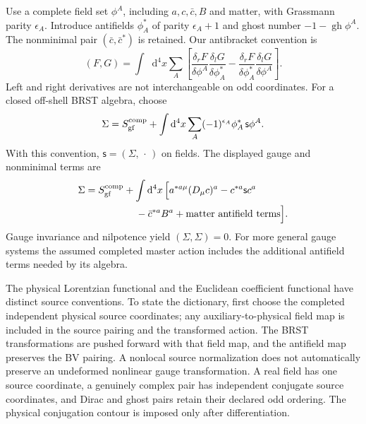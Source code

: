 \documentclass[final,5p,times,twocolumn,numbers,nopreprintline]{elsarticle}
\numberwithin{equation}{section}
\theoremstyle{definition}
\theoremstyle{remark}
\newcommand{\dd}{\mathop{}\!\mathrm d}
\newcommand{\BR}{\mathsf s}
\begin{document}
Use a complete field set \(\phi^A\), including \(a,c,\bar c,B\)
and matter, with Grassmann parity \(\epsilon_A\).
Introduce antifields \(\phi_A^*\) of parity \(\epsilon_A+1\)
and ghost number \(-1-\operatorname{gh}\phi^A\).
The nonminimal pair \((\bar c,\bar c^*)\) is retained.
Our antibracket convention is
\begin{equation}
 (F,G)=\int\dd^4x\sum_A
 \left[
 \frac{\delta_rF}{\delta\phi^A}
 \frac{\delta_lG}{\delta\phi_A^*}
 -
 \frac{\delta_rF}{\delta\phi_A^*}
 \frac{\delta_lG}{\delta\phi^A}
 \right].
 \label{eq:antibracket}
\end{equation}
Left and right derivatives are not interchangeable on odd
coordinates. For a closed off-shell BRST algebra, choose
\begin{equation}
 \Sigma=S_{\rm gf}^{\rm comp}
       +\int\dd^4x\sum_A(-1)^{\epsilon_A}
                   \phi_A^*\,\BR\phi^A.
 \label{eq:bv-action}
\end{equation}
With this convention, \(\BR=(\Sigma,\,\cdot\,)\) on fields.
The displayed gauge and nonminimal terms are
\[
\begin{aligned}
 \Sigma={}&S_{\rm gf}^{\rm comp}
  +\int\dd^4x\,\Bigl[
       a^{*a\mu}(D_\mu c)^a
       -c^{*a}\BR c^a\\
   &\hspace{3.8em}-\bar c^{*a}B^a
       +\hbox{matter antifield terms}\Bigr].
\end{aligned}
\]
Gauge invariance and nilpotence yield
\((\Sigma,\Sigma)=0\).
For more general gauge systems the assumed completed master action
includes the additional antifield terms needed by its algebra.

The physical Lorentzian functional and the Euclidean coefficient
functional have distinct source conventions. To state the dictionary,
first choose the completed independent physical source coordinates;
any auxiliary-to-physical field map is included in the source pairing
and the transformed action. The BRST transformations are pushed
forward with that field map, and the antifield map preserves the BV
pairing. A nonlocal source normalization does not automatically
preserve an undeformed nonlinear gauge transformation. A real field has one source coordinate,
a genuinely complex pair has independent conjugate source coordinates,
and Dirac and ghost pairs retain their declared odd ordering. The
physical conjugation contour is imposed only after differentiation.
\end{document}
